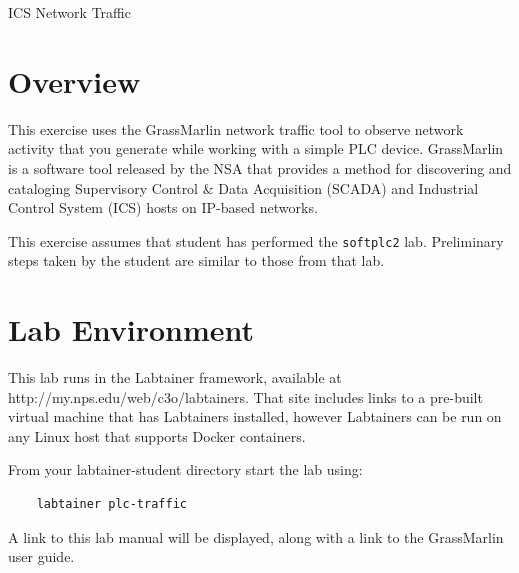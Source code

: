 


\begin{center}
{\LARGE ICS Network Traffic}
\vspace{0.1in}\\
\end{center}


\section{Overview}
This exercise uses the GrassMarlin network traffic tool to
observe network activity that you generate while working
with a simple PLC device.  
GrassMarlin is a software tool released by the NSA that provides a method for discovering and cataloging
Supervisory Control \& Data Acquisition (SCADA) and Industrial Control System (ICS) hosts on IP-based
networks.  

This exercise assumes that student has performed the {\tt softplc2} lab.
Preliminary steps taken by the student are similar to those from that lab.

\section{Lab Environment}
This lab runs in the Labtainer framework,
available at http://my.nps.edu/web/c3o/labtainers.
That site includes links to a pre-built virtual machine
that has Labtainers installed, however Labtainers can
be run on any Linux host that supports Docker containers.

From your labtainer-student directory start the lab using:
\begin{verbatim}
    labtainer plc-traffic
\end{verbatim}
A link to this lab manual will be displayed, along with a link to the GrassMarlin 
user guide.

